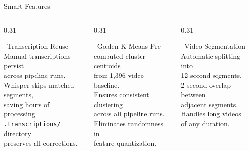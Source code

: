 \begin{frame}{Smart Features}
  \vspace{2pt}
  \begin{columns}[T]
    \begin{column}{0.31\textwidth}
      \begin{block}{\small {}~Transcription Reuse}
        {\scriptsize Manual transcriptions persist\\
        across pipeline runs.\\[3pt]
        Whisper skips matched segments,\\
        saving hours of processing.\\[3pt]
        \texttt{.transcriptions/} directory\\
        preserves all corrections.}
      \end{block}
    \end{column}
    \begin{column}{0.31\textwidth}
      \begin{block}{\small {}~Golden K-Means}
        {\scriptsize Pre-computed cluster centroids\\
        from 1,396-video baseline.\\[3pt]
        Ensures consistent clustering\\
        across all pipeline runs.\\[3pt]
        Eliminates randomness in\\
        feature quantization.}
      \end{block}
    \end{column}
    \begin{column}{0.31\textwidth}
      \begin{block}{\small {}~Video Segmentation}
        {\scriptsize Automatic splitting into\\
        12-second segments.\\[3pt]
        2-second overlap between\\
        adjacent segments.\\[3pt]
        Handles long videos\\
        of any duration.}
      \end{block}
    \end{column}
  \end{columns}

\end{frame}

